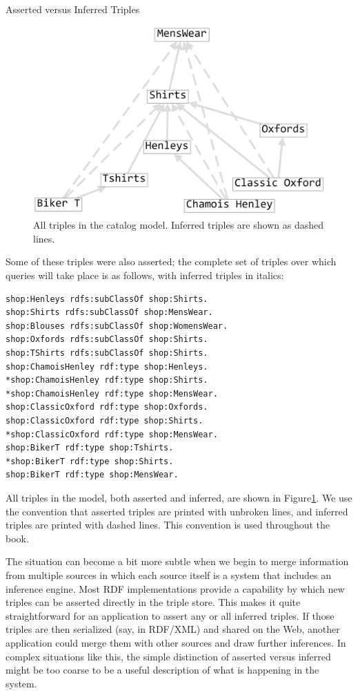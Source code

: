\begin{example}{Asserted versus Inferred Triples}
\begin{figure}
\centering
\includegraphics[width=5in]{SWWOv3/media/ch7/figure7-3.png}
\caption{All triples in the catalog model. Inferred triples are shown as dashed
lines.}
\label{fig:ch7.3}
\end{figure}



Some of these triples were also asserted; the complete set of triples
over which queries will take place is as follows, with inferred triples
in italics:

\begin{lstlisting}
shop:Henleys rdfs:subClassOf shop:Shirts.
shop:Shirts rdfs:subClassOf shop:MensWear.
shop:Blouses rdfs:subClassOf shop:WomensWear.
shop:Oxfords rdfs:subClassOf shop:Shirts.
shop:TShirts rdfs:subClassOf shop:Shirts.
shop:ChamoisHenley rdf:type shop:Henleys.
*shop:ChamoisHenley rdf:type shop:Shirts.
*shop:ChamoisHenley rdf:type shop:MensWear.
shop:ClassicOxford rdf:type shop:Oxfords.
shop:ClassicOxford rdf:type shop:Shirts.
*shop:ClassicOxford rdf:type shop:MensWear.
shop:BikerT rdf:type shop:Tshirts.
*shop:BikerT rdf:type shop:Shirts.
shop:BikerT rdf:type shop:MensWear.
\end{lstlisting}

All triples in the model, both asserted and inferred, are shown in
Figure\ref{fig:ch7.3}. We use the convention that asserted triples are printed with
unbroken lines, and inferred triples are printed with dashed lines. This
convention is used throughout the book.
\end{example}

The situation can become a bit more subtle when we begin to merge
information from multiple sources in which each source itself is a
system that includes an inference engine. Most RDF implementations
provide a capability by which new triples can be asserted directly in
the triple store. This makes it quite straightforward for an application
to assert any or all inferred triples. If those triples are then
serialized (say, in RDF/XML) and shared on the Web, another application
could merge them with other sources and draw further inferences. In
complex situations like this, the simple distinction of asserted versus
inferred might be too coarse to be a useful description of what is
happening in the system.


